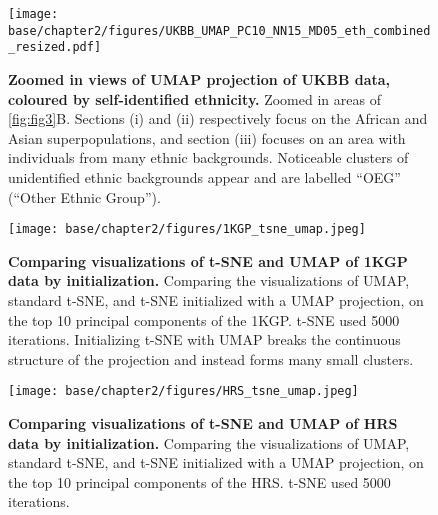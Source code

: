 \newpage

\begin{figure}[ht]
    \centering
    \texttt{[image: base/chapter2/figures/UKBB\_UMAP\_PC10\_NN15\_MD05\_eth\_combined\_resized.pdf]}
    \caption[Zoomed in views of UMAP projection of UKBB data, coloured by self-identified ethnicity]{\textbf{Zoomed in views of UMAP projection of UKBB data, coloured by self-identified ethnicity.} Zoomed in areas of \ref{fig:fig3}B. Sections (i) and (ii) respectively focus on the African and Asian superpopulations, and section (iii) focuses on an area with individuals from many ethnic backgrounds. Noticeable clusters of unidentified ethnic backgrounds appear and are labelled ``OEG'' (``Other Ethnic Group'').}
    \label{fig:supp_ukbb_zoom}
\end{figure}

\newpage

\begin{figure}[!htb]
    \centering
    \texttt{[image: base/chapter2/figures/1KGP\_tsne\_umap.jpeg]}
    \caption[Comparing visualizations of t-SNE and UMAP of 1KGP data by initialization]{\textbf{Comparing visualizations of t-SNE and UMAP of 1KGP data by initialization.} Comparing the visualizations of UMAP, standard t-SNE, and t-SNE initialized with a UMAP projection, on the top 10 principal components of the 1KGP. t-SNE used 5000 iterations. Initializing t-SNE with UMAP breaks the continuous structure of the projection and instead forms many small clusters.}
    \label{fig:supp_tsne_umap_compare_1kgp}
\end{figure}

\newpage

\begin{figure}[!htb]
    \centering
    \texttt{[image: base/chapter2/figures/HRS\_tsne\_umap.jpeg]}
    \caption[Comparing visualizations of t-SNE and UMAP of HRS data by initialization]{\textbf{Comparing visualizations of t-SNE and UMAP of HRS data by initialization.} Comparing the visualizations of UMAP, standard t-SNE, and t-SNE initialized with a UMAP projection, on the top 10 principal components of the HRS. t-SNE used 5000 iterations.}
    \label{fig:supp_tsne_umap_compare_hrs}
\end{figure}

\newpage

